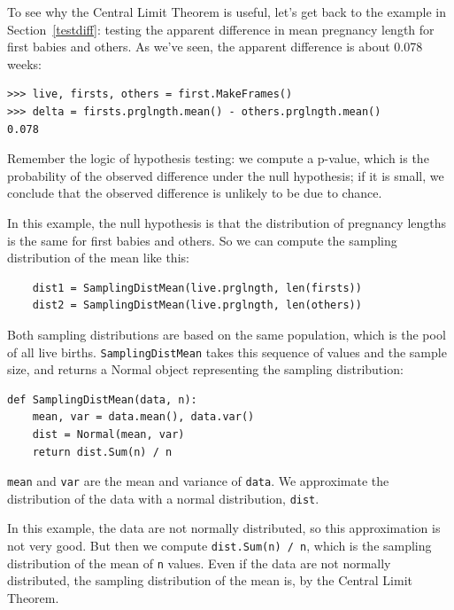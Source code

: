 \documentclass[12pt]{book}
\begin{document}
To see why the Central Limit Theorem is useful, let's get back
to the example in Section~\ref{testdiff}: testing the apparent
difference in mean pregnancy length for first babies and others.
As we've seen, the apparent difference is about
0.078 weeks:

\begin{verbatim}
>>> live, firsts, others = first.MakeFrames()
>>> delta = firsts.prglngth.mean() - others.prglngth.mean()
0.078
\end{verbatim}

Remember the logic of hypothesis testing: we compute a p-value, which
is the probability of the observed difference under the null
hypothesis; if it is small, we conclude that the observed difference
is unlikely to be due to chance.

In this example, the null hypothesis is that the distribution of
pregnancy lengths is the same for first babies and others.  
So we can compute the sampling distribution of the mean
like this:

\begin{verbatim}
    dist1 = SamplingDistMean(live.prglngth, len(firsts))
    dist2 = SamplingDistMean(live.prglngth, len(others))
\end{verbatim}

Both sampling distributions are based on the same population, which is
the pool of all live births.  \verb"SamplingDistMean" takes this
sequence of values and the sample size, and returns a Normal object
representing the sampling distribution:

\begin{verbatim}
def SamplingDistMean(data, n):
    mean, var = data.mean(), data.var()
    dist = Normal(mean, var)
    return dist.Sum(n) / n
\end{verbatim}

\verb"mean" and \verb"var" are the mean and variance of
\verb"data".  We approximate the distribution of the data with
a normal distribution, \verb"dist".  

In this example, the data are not normally distributed, so this
approximation is not very good.  But then we compute \verb"dist.Sum(n) / n",
which is the sampling distribution of the mean of \verb"n"
values.  Even if the data are not normally distributed, the sampling
distribution of the mean is, by the Central Limit Theorem.
\end{document}
